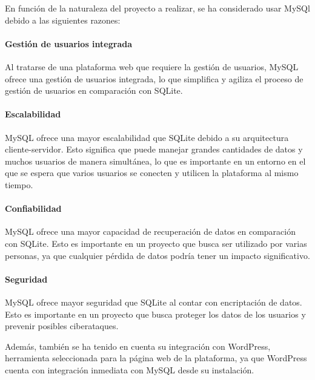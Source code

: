                 En función de la naturaleza del proyecto a realizar, se ha considerado usar MySQl debido a las siguientes razones:
                    
                \paragraph{Gestión de usuarios integrada}
                    
                    Al tratarse de una plataforma web que requiere la gestión de usuarios, MySQL ofrece una gestión de usuarios integrada, lo que simplifica y agiliza el proceso de gestión de usuarios en comparación con SQLite.
                
                \paragraph{Escalabilidad}
                    
                    MySQL ofrece una mayor escalabilidad que SQLite debido a su arquitectura cliente-servidor. Esto significa que puede manejar grandes cantidades de datos y muchos usuarios de manera simultánea, lo que es importante en un entorno en el que se espera que varios usuarios se conecten y utilicen la plataforma al mismo tiempo.

                \paragraph{Confiabilidad}
                    
                    MySQL ofrece una mayor capacidad de recuperación de datos en comparación con SQLite. Esto es importante en un proyecto que busca ser utilizado por varias personas, ya que cualquier pérdida de datos podría tener un impacto significativo.

                \paragraph{Seguridad}
                    
                    MySQL ofrece mayor seguridad que SQLite al contar con encriptación de datos. Esto es importante en un proyecto que busca proteger los datos de los usuarios y prevenir posibles ciberataques.

                    Además, también se ha tenido en cuenta su integración con WordPress, herramienta seleccionada para la página web de la plataforma, ya que WordPress cuenta con integración inmediata con MySQL desde su instalación.    

